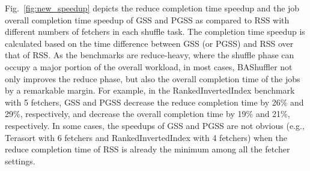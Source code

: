 \documentclass[10pt,journal,compsoc]{IEEEtran}
\begin{document}
Fig.~\ref{fig:new_speedup} depicts the reduce completion time speedup
and the job overall completion time speedup of GSS and PGSS as
compared to RSS with different numbers of fetchers in each shuffle
task.
The completion time speedup is calculated based on the time difference between GSS (or PGSS) and RSS over that of RSS. 
As the benchmarks are reduce-heavy, where the shuffle phase can occupy
a major portion of the overall workload, in most cases, BAShuffler not
only improves the reduce phase, but also the overall
completion time of the jobs by a remarkable margin.
For example, in the RankedInvertedIndex benchmark with 5 fetchers, 
GSS and PGSS decrease the reduce completion time by 26\% and 29\%, respectively, 
and decrease the overall completion time by 19\% and 21\%, respectively.  
In some cases, the speedups of GSS and PGSS are not obvious (e.g.,
Terasort with 6 fetchers and RankedInvertedIndex with 4 fetchers) when
the reduce completion time of RSS is already the minimum among all the
fetcher settings.




\end{document}
